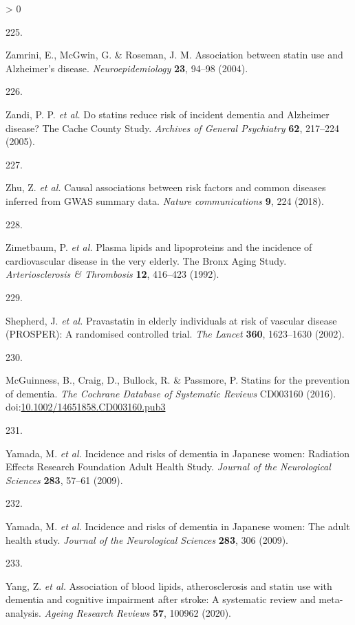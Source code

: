 \documentclass[a4paper, twoside]{templates/ociamthesis}
\newlength{\cslhangindent}
\newlength{\csllabelwidth}
\newenvironment{CSLReferences}[3] %
 {%
  \setlength{\parindent}{0pt}
  \ifodd #1 \everypar{\setlength{\hangindent}{\cslhangindent}}\ignorespaces\fi
  \ifnum #2 > 0
  \setlength{\parskip}{#2\baselineskip}
  \fi
 }%
 {}
\newcommand{\CSLLeftMargin}[1]{\parbox[t]{\maxof{\widthof{#1}}{\csllabelwidth}}{#1}}
\newcommand{\CSLRightInline}[1]{\parbox[t]{\linewidth - \csllabelwidth}{#1}}
\begin{document}
\begin{CSLReferences}{0}{0}
\leavevmode\hypertarget{ref-zamrini2004}{}%
\CSLLeftMargin{225. }
\CSLRightInline{Zamrini, E., McGwin, G. \& Roseman, J. M. Association between statin use and {Alzheimer}'s disease. \emph{Neuroepidemiology} \textbf{23}, 94--98 (2004).}

\leavevmode\hypertarget{ref-zandi2005}{}%
\CSLLeftMargin{226. }
\CSLRightInline{Zandi, P. P. \emph{et al.} Do statins reduce risk of incident dementia and {Alzheimer} disease? {The Cache County Study}. \emph{Archives of General Psychiatry} \textbf{62}, 217--224 (2005).}

\leavevmode\hypertarget{ref-zhu2018a}{}%
\CSLLeftMargin{227. }
\CSLRightInline{Zhu, Z. \emph{et al.} Causal associations between risk factors and common diseases inferred from {GWAS} summary data. \emph{Nature communications} \textbf{9}, 224 (2018).}

\leavevmode\hypertarget{ref-zimetbaum1992}{}%
\CSLLeftMargin{228. }
\CSLRightInline{Zimetbaum, P. \emph{et al.} Plasma lipids and lipoproteins and the incidence of cardiovascular disease in the very elderly. {The Bronx Aging Study}. \emph{Arteriosclerosis \& Thrombosis} \textbf{12}, 416--423 (1992).}

\leavevmode\hypertarget{ref-shepherd2002a}{}%
\CSLLeftMargin{229. }
\CSLRightInline{Shepherd, J. \emph{et al.} Pravastatin in elderly individuals at risk of vascular disease ({PROSPER}): A randomised controlled trial. \emph{The Lancet} \textbf{360}, 1623--1630 (2002).}

\leavevmode\hypertarget{ref-mcguinness2016}{}%
\CSLLeftMargin{230. }
\CSLRightInline{McGuinness, B., Craig, D., Bullock, R. \& Passmore, P. Statins for the prevention of dementia. \emph{The Cochrane Database of Systematic Reviews} CD003160 (2016). doi:\href{https://doi.org/10.1002/14651858.CD003160.pub3}{10.1002/14651858.CD003160.pub3}}

\leavevmode\hypertarget{ref-yamada2009}{}%
\CSLLeftMargin{231. }
\CSLRightInline{Yamada, M. \emph{et al.} Incidence and risks of dementia in {Japanese} women: {Radiation Effects Research Foundation Adult Health Study}. \emph{Journal of the Neurological Sciences} \textbf{283}, 57--61 (2009).}

\leavevmode\hypertarget{ref-yamada2009a}{}%
\CSLLeftMargin{232. }
\CSLRightInline{Yamada, M. \emph{et al.} Incidence and risks of dementia in {Japanese} women: {The} adult health study. \emph{Journal of the Neurological Sciences} \textbf{283}, 306 (2009).}

\leavevmode\hypertarget{ref-yang2020}{}%
\CSLLeftMargin{233. }
\CSLRightInline{Yang, Z. \emph{et al.} Association of blood lipids, atherosclerosis and statin use with dementia and cognitive impairment after stroke: {A} systematic review and meta-analysis. \emph{Ageing Research Reviews} \textbf{57}, 100962 (2020).}


\end{CSLReferences}
\end{document}
